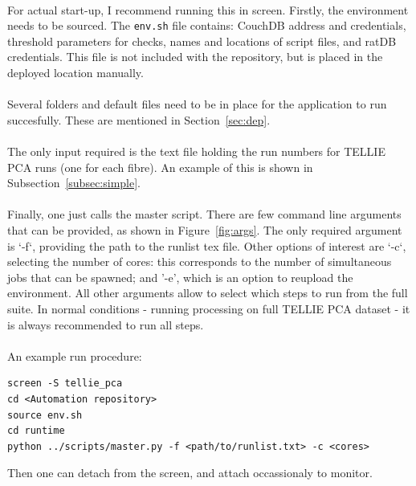 \documentclass[12pt]{article}
\begin{document}
\paragraph{}
For actual start-up, I recommend running this in screen. Firstly, the environment needs to be sourced. The \texttt{env.sh} file contains: CouchDB address and credentials, threshold parameters for checks, names and locations of script files, and ratDB credentials. This file is not included with the repository, but is placed in the deployed location manually.

\paragraph{}
Several folders and default files need to be in place for the application to run succesfully. These are mentioned in Section~\ref{sec:dep}.

\paragraph{}
The only input required is the text file holding the run numbers for TELLIE PCA runs (one for each fibre). An example of this is shown in Subsection~\ref{subsec:simple}.

\paragraph{}
Finally, one just calls the master script. There are few command line arguments that can be provided, as shown in Figure~\ref{fig:args}. The only required argument is `-f`, providing the path to the runlist tex file. Other options of interest are `-c`, selecting the number of cores: this corresponds to the number of simultaneous jobs that can be spawned; and '-e', which is an option to reupload the environment. All other arguments allow to select which steps to run from the full suite. In normal conditions - running processing on full TELLIE PCA dataset - it is always recommended to run all steps.

\paragraph{}
An example run procedure:
\begin{lstlisting}
screen -S tellie_pca
cd <Automation repository>
source env.sh
cd runtime
python ../scripts/master.py -f <path/to/runlist.txt> -c <cores>
\end{lstlisting}
Then one can detach from the screen, and attach occassionaly to monitor.
\end{document}

